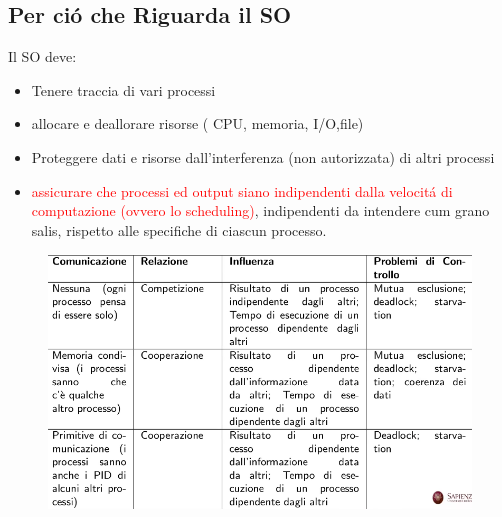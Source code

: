 \subsection{Per ció che Riguarda il SO}
Il SO deve:
\begin{itemize}
    \item Tenere traccia di vari processi
    \item allocare e deallorare risorse ( CPU, memoria, I/O,file)
    \item Proteggere dati e risorse dall'interferenza (non autorizzata) di altri processi
    \item \textcolor{red}{assicurare che processi ed output siano indipendenti dalla velocitá di computazione (ovvero lo scheduling)}, indipendenti da intendere cum grano salis, rispetto alle specifiche di ciascun processo.
\end{itemize}
\begin{figure}[H]
    \centering
    \includegraphics[width=0.7\linewidth]{immagini/RiassuntoComunicazioneTraProcessi}
\end{figure}
